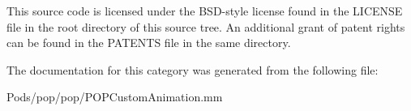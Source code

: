 This source code is licensed under the B\+S\+D-\/style license found in the L\+I\+C\+E\+N\+SE file in the root directory of this source tree. An additional grant of patent rights can be found in the P\+A\+T\+E\+N\+TS file in the same directory. 

The documentation for this category was generated from the following file\+:\begin{DoxyCompactItemize}
\item 
Pods/pop/pop/P\+O\+P\+Custom\+Animation.\+mm\end{DoxyCompactItemize}
